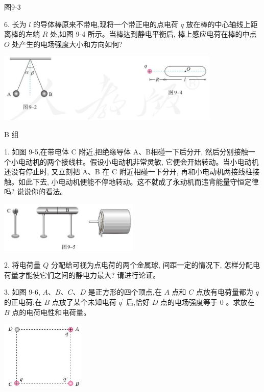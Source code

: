 \documentclass[10pt]{article}
\begin{document}
图9-3

6. 长为 \(l\) 的导体棒原来不带电,现将一个带正电的点电荷 \(q\) 放在棒的中心轴线上距离棒的左端 \(R\) 处,如图 9-4 所示。当棒达到静电平衡后, 棒上感应电荷在棒的中点 \(O\) 处产生的电场强度大小和方向如何?

\begin{center}
\includegraphics[max width=0.8\textwidth]{images/01911d5f-8e38-70c0-b5b8-2b399bd115b6_28_229507.jpg}
\end{center}

B 组

1. 如图 9-5,在带电体 \(\mathrm{C}\) 附近,把绝缘导体 A、B相碰一下后分开, 然后分别接触一个小电动机的两个接线柱。假设小电动机非常灵敏, 它便会开始转动。当小电动机还没有停止时, 又立刻把 A、B 在 C 附近相碰一下分开, 再和小电动机两接线柱接触。如此下去, 小电动机便能不停地转动。这不就成了永动机而违背能量守恒定律吗? 说说你的看法。

\begin{center}
\includegraphics[max width=0.5\textwidth]{images/01911d5f-8e38-70c0-b5b8-2b399bd115b6_28_524633.jpg}
\end{center}

2. 将电荷量 \(Q\) 分配给可视为点电荷的两个金属球, 间距一定的情况下, 怎样分配电荷量才能使它们之间的静电力最大? 请进行论证。

3. 如图 9-6, \(A\text{、}B\text{、}C\text{、}D\) 是正方形的四个顶点,在 \(A\) 点和 \(C\) 点放有电荷量都为 \(q\) 的正电荷,在 \(B\) 点放了某个未知电荷 \({q}^{\prime }\) 后,恰好 \(D\) 点的电场强度等于 0 。求放在 \(B\) 点的电荷电性和电荷量。

\begin{center}
\includegraphics[max width=0.3\textwidth]{images/01911d5f-8e38-70c0-b5b8-2b399bd115b6_29_908303.jpg}
\end{center}
\end{document}
